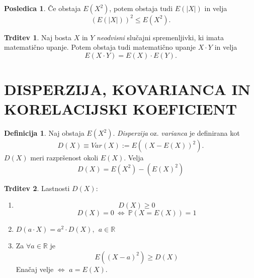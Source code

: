 \documentclass[11pt]{article}
\theoremstyle{definition}
\newtheorem{definicija}{Definicija}[section]
\theoremstyle{definition}
\newtheorem{trditev}{Trditev}[section]
\theoremstyle{definition}
\newtheorem*{posledica}{Posledica}
\begin{document}
\begin{posledica}

Če obstaja $E(X^2)$, potem obstaja tudi $E(|X|)$ in velja
$$(E(|X|))^2 \leq E(X^2).$$

\end{posledica}
\vspace{0.5cm}

\begin{trditev}

Naj bosta $X$ in $Y$ \textit{neodvisni} slučajni spremenljivki, ki imata matematično upanje. Potem obstaja tudi matematično upanje $X \cdot Y$ in velja
$$E(X \cdot Y) = E(X) \cdot E(Y).$$

\end{trditev}
\vspace{0.5cm}

\pagebreak


\section{DISPERZIJA, KOVARIANCA IN KORELACIJSKI KOEFICIENT}
\vspace{0.5cm}

\begin{definicija}

Naj obstaja $E(X^2)$. \textit{Disperzija} oz. \textit{varianca} je definirana kot
$$D(X) \equiv Var(X) := E((X - E(X))^2).$$
$D(X)$ meri razpršenost okoli $E(X)$. Velja
$$D(X) = E(X^2) - (E(X)^2)$$

\end{definicija}
\vspace{0.5cm}

\begin{trditev}

Lastnosti $D(X)$:
\begin{enumerate}
	\item $$D(X) \geq 0$$
	$$D(X) = 0 ~\Leftrightarrow~ \mathbb{P}(X = E(X)) = 1$$
	\item $D(a \cdot X) = a^2 \cdot D(X), ~~a \in \mathbb{R}$
	\item Za $\forall a \in \mathbb{R}$ je 
	$$E((X - a)^2) \geq D(X)$$
	Enačaj velje $\Leftrightarrow$ $a = E(X)$.
\end{enumerate}

\end{trditev}
\vspace{0.5cm}
\end{document}
